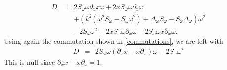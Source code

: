 \documentclass[a4paper]{article}
\begin{document}
\begin{eqnarray*}
	D &=& 2 S_\omega \omega \partial_x x\omega + 2 x S_\omega  \omega \partial_x \omega \\
	&& + \left(k^2(\omega^2 S_\omega - S_\omega \omega^2) + \Delta_\omega S_\omega - S_\omega \Delta_\omega \right)\omega^2\\
	&& - 2 S_\omega \omega^2 - 2 x  S_\omega \omega \partial_x \omega - 2 S_\omega \omega x \partial_x \omega.
\end{eqnarray*}
Using again the commutation shown in \autoref{commutations}, we are left with 
\begin{eqnarray*}
	D &=&  2 S_\omega \omega (\partial_x x - x \partial_x) \omega - 2 S_\omega \omega^2
\end{eqnarray*}
This is null since $\partial_x x - x \partial_x = 1$. 

	
	
	
	
	
	
	
	
	
\end{document}
